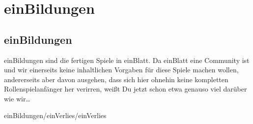 \part {einBildungen}
\chapter {einBildungen}
einBildungen sind die fertigen Spiele in einBlatt. Da einBlatt eine Community ist und wir einerseits keine inhaltlichen Vorgaben für diese Spiele machen wollen, andererseits aber davon ausgehen, dass sich hier ohnehin keine kompletten Rollenspielanfänger her verirren, weißt Du jetzt schon etwa genauso viel darüber wie wir\dots

 {einBildungen/einVerlies/einVerlies} 
